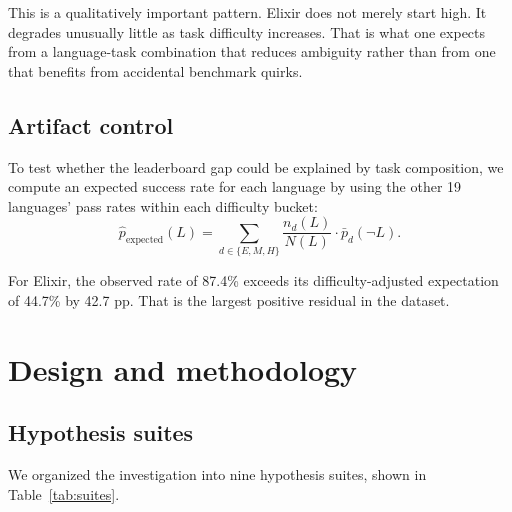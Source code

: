 \documentclass[11pt]{article}
\newcommand{\pp}{pp}
\newcommand{\elixir}{Elixir}
\newcommand{\expectedp}{\hat{p}_{\mathrm{expected}}}
\begin{document}
This is a qualitatively important pattern. \elixir{} does not merely start high. It degrades unusually little as task difficulty increases. That is what one expects from a language-task combination that reduces ambiguity rather than from one that benefits from accidental benchmark quirks.

\subsection{Artifact control}

To test whether the leaderboard gap could be explained by task composition, we compute an expected success rate for each language by using the other 19 languages' pass rates within each difficulty bucket:
\begin{equation}
\expectedp(L) = \sum_{d \in \{E,M,H\}} \frac{n_d(L)}{N(L)} \cdot \bar{p}_d(\neg L).
\label{eq:expected}
\end{equation}

For \elixir{}, the observed rate of 87.4\% exceeds its difficulty-adjusted expectation of 44.7\% by 42.7 \pp{}. That is the largest positive residual in the dataset.

\section{Design and methodology}

\subsection{Hypothesis suites}

We organized the investigation into nine hypothesis suites, shown in Table~\ref{tab:suites}.
\end{document}
